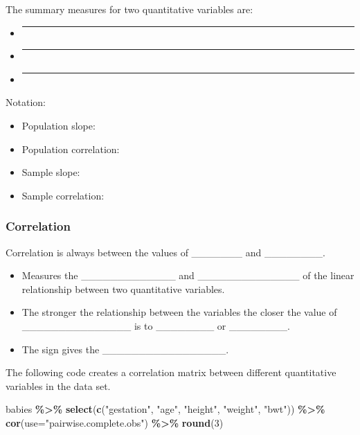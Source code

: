 \documentclass[
]{report}
\newenvironment{Shaded}{\begin{snugshade}}{\end{snugshade}}
\newcommand{\AttributeTok}[1]{\textcolor[rgb]{0.13,0.29,0.53}{#1}}
\newcommand{\DecValTok}[1]{\textcolor[rgb]{0.00,0.00,0.81}{#1}}
\newcommand{\FunctionTok}[1]{\textcolor[rgb]{0.13,0.29,0.53}{\textbf{#1}}}
\newcommand{\NormalTok}[1]{#1}
\newcommand{\SpecialCharTok}[1]{\textcolor[rgb]{0.81,0.36,0.00}{\textbf{#1}}}
\newcommand{\StringTok}[1]{\textcolor[rgb]{0.31,0.60,0.02}{#1}}
\begin{document}
The summary measures for two quantitative variables are:

\begin{itemize}
\item
  \begin{center}\rule{0.5\linewidth}{0.5pt}\end{center}
\item
  \begin{center}\rule{0.5\linewidth}{0.5pt}\end{center}
\item
  \begin{center}\rule{0.5\linewidth}{0.5pt}\end{center}
\end{itemize}


Notation:

\begin{itemize}
\item
  Population slope:
\item
  Population correlation:
\item
  Sample slope:
\item
  Sample correlation:
\end{itemize}

\subsubsection*{Correlation}\label{correlation}

Correlation is always between the values of \_\_\_\_\_\_\_ and \_\_\_\_\_\_\_\_.

\begin{itemize}
\item
  Measures the \_\_\_\_\_\_\_\_\_\_\_\_\_ and \_\_\_\_\_\_\_\_\_\_\_\_\_\_ of the linear relationship between two quantitative variables.
\item
  The stronger the relationship between the variables the closer the value of \_\_\_\_\_\_\_\_\_\_\_\_\_\_\_ is to \_\_\_\_\_\_\_\_ or \_\_\_\_\_\_\_\_.
\item
  The sign gives the \_\_\_\_\_\_\_\_\_\_\_\_\_\_\_\_\_.
\end{itemize}

The following code creates a correlation matrix between different quantitative variables in the data set.

\begin{Shaded}
\begin{Highlighting}[]
\NormalTok{babies }\SpecialCharTok{\%\textgreater{}\%}
    \FunctionTok{select}\NormalTok{(}\FunctionTok{c}\NormalTok{(}\StringTok{"gestation"}\NormalTok{, }\StringTok{"age"}\NormalTok{, }\StringTok{"height"}\NormalTok{, }\StringTok{"weight"}\NormalTok{, }\StringTok{"bwt"}\NormalTok{)) }\SpecialCharTok{\%\textgreater{}\%}
    \FunctionTok{cor}\NormalTok{(}\AttributeTok{use=}\StringTok{"pairwise.complete.obs"}\NormalTok{) }\SpecialCharTok{\%\textgreater{}\%}
    \FunctionTok{round}\NormalTok{(}\DecValTok{3}\NormalTok{)}
\end{Highlighting}
\end{Shaded}
\end{document}
